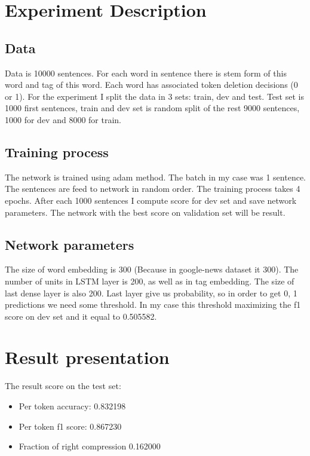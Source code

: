 \documentclass[a4paper,12pt,oneside]{article}
\begin{document}
\section{Experiment Description}

\subsection{Data}
Data is 10000 sentences. For each word in sentence there is stem form of this word and tag of this word. Each word has associated token deletion decisions (0 or 1). For the experiment I split the data in 3 sets: train, dev and test. Test set is 1000 first sentences, train and dev set is random split of the rest 9000 sentences, 1000 for dev and 8000 for train.


\subsection{Training process}
The network is trained using adam method. The batch in my case was 1 sentence. The sentences are feed to network in random order. The training process takes 4 epochs. After each 1000 sentences I compute score for dev set and save network parameters. The network with the best score on validation set will be result. 

\subsection{Network parameters}
The size of word embedding is 300 (Because in google-news dataset it 300). The number of units in LSTM layer is 200, as well as in tag embedding. The size of last dense layer is also 200. Last layer give us probability, so in order to get 0, 1 predictions we need some threshold. In my case this threshold maximizing the f1 score on dev set and it equal to 0.505582.

\section{Result presentation}
The result score on the test set:

\begin{itemize}
  \item Per token accuracy: 0.832198
  \item Per token f1 score: 0.867230
  \item Fraction of right compression 0.162000
\end{itemize}
\end{document}
